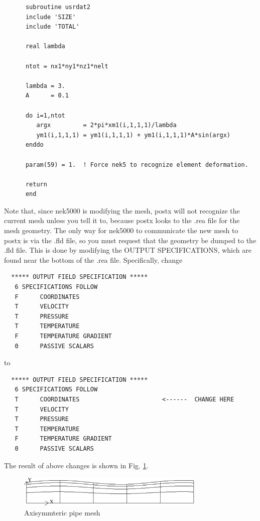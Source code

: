 \begin{verbatim}
      subroutine usrdat2
      include 'SIZE'
      include 'TOTAL'

      real lambda

      ntot = nx1*ny1*nz1*nelt

      lambda = 3.
      A      = 0.1

      do i=1,ntot
         argx         = 2*pi*xm1(i,1,1,1)/lambda
         ym1(i,1,1,1) = ym1(i,1,1,1) + ym1(i,1,1,1)*A*sin(argx)
      enddo

      param(59) = 1.  ! Force nek5 to recognize element deformation.

      return
      end
\end{verbatim}
\noindent
Note that, since nek5000 is modifying the mesh, postx will not
recognize the current mesh unless you tell it to, because postx
looks to the .rea file for the mesh geometry.  The only way for
nek5000 to communicate the new mesh to postx is via the .fld
file, so you must request that the geometry be dumped to the
.fld file.   This is done by modifying the OUTPUT SPECIFICATIONS,
which are found near the bottom of the .rea file.  Specifically,
change

\begin{verbatim}
  ***** OUTPUT FIELD SPECIFICATION *****
   6 SPECIFICATIONS FOLLOW
   F      COORDINATES
   T      VELOCITY
   T      PRESSURE
   T      TEMPERATURE
   F      TEMPERATURE GRADIENT
   0      PASSIVE SCALARS
\end{verbatim} 

\noindent
to

\begin{verbatim}
  ***** OUTPUT FIELD SPECIFICATION *****
   6 SPECIFICATIONS FOLLOW
   T      COORDINATES                       <------  CHANGE HERE
   T      VELOCITY
   T      PRESSURE
   T      TEMPERATURE
   F      TEMPERATURE GRADIENT
   0      PASSIVE SCALARS
\end{verbatim} 

\noindent
The result of above changes is shown in Fig. \ref{fig:wavypipe}.
\begin{figure}
\centering
\includegraphics[width=0.8\textwidth]{Figs/wavypipe}
\caption{Axisymmteric pipe mesh}
\label{fig:wavypipe}
\end{figure}


